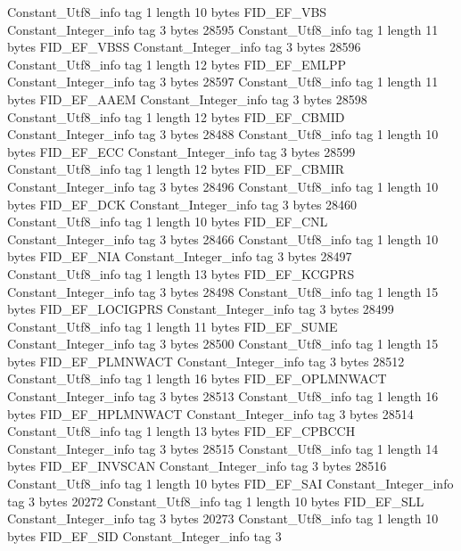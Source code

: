 {{		Constant_Utf8_info {
			tag	1
			length	10
			bytes	FID_EF_VBS
		}
		Constant_Integer_info {
			tag	3
			bytes	28595
		}
		Constant_Utf8_info {
			tag	1
			length	11
			bytes	FID_EF_VBSS
		}
		Constant_Integer_info {
			tag	3
			bytes	28596
		}
		Constant_Utf8_info {
			tag	1
			length	12
			bytes	FID_EF_EMLPP
		}
		Constant_Integer_info {
			tag	3
			bytes	28597
		}
		Constant_Utf8_info {
			tag	1
			length	11
			bytes	FID_EF_AAEM
		}
		Constant_Integer_info {
			tag	3
			bytes	28598
		}
		Constant_Utf8_info {
			tag	1
			length	12
			bytes	FID_EF_CBMID
		}
		Constant_Integer_info {
			tag	3
			bytes	28488
		}
		Constant_Utf8_info {
			tag	1
			length	10
			bytes	FID_EF_ECC
		}
		Constant_Integer_info {
			tag	3
			bytes	28599
		}
		Constant_Utf8_info {
			tag	1
			length	12
			bytes	FID_EF_CBMIR
		}
		Constant_Integer_info {
			tag	3
			bytes	28496
		}
		Constant_Utf8_info {
			tag	1
			length	10
			bytes	FID_EF_DCK
		}
		Constant_Integer_info {
			tag	3
			bytes	28460
		}
		Constant_Utf8_info {
			tag	1
			length	10
			bytes	FID_EF_CNL
		}
		Constant_Integer_info {
			tag	3
			bytes	28466
		}
		Constant_Utf8_info {
			tag	1
			length	10
			bytes	FID_EF_NIA
		}
		Constant_Integer_info {
			tag	3
			bytes	28497
		}
		Constant_Utf8_info {
			tag	1
			length	13
			bytes	FID_EF_KCGPRS
		}
		Constant_Integer_info {
			tag	3
			bytes	28498
		}
		Constant_Utf8_info {
			tag	1
			length	15
			bytes	FID_EF_LOCIGPRS
		}
		Constant_Integer_info {
			tag	3
			bytes	28499
		}
		Constant_Utf8_info {
			tag	1
			length	11
			bytes	FID_EF_SUME
		}
		Constant_Integer_info {
			tag	3
			bytes	28500
		}
		Constant_Utf8_info {
			tag	1
			length	15
			bytes	FID_EF_PLMNWACT
		}
		Constant_Integer_info {
			tag	3
			bytes	28512
		}
		Constant_Utf8_info {
			tag	1
			length	16
			bytes	FID_EF_OPLMNWACT
		}
		Constant_Integer_info {
			tag	3
			bytes	28513
		}
		Constant_Utf8_info {
			tag	1
			length	16
			bytes	FID_EF_HPLMNWACT
		}
		Constant_Integer_info {
			tag	3
			bytes	28514
		}
		Constant_Utf8_info {
			tag	1
			length	13
			bytes	FID_EF_CPBCCH
		}
		Constant_Integer_info {
			tag	3
			bytes	28515
		}
		Constant_Utf8_info {
			tag	1
			length	14
			bytes	FID_EF_INVSCAN
		}
		Constant_Integer_info {
			tag	3
			bytes	28516
		}
		Constant_Utf8_info {
			tag	1
			length	10
			bytes	FID_EF_SAI
		}
		Constant_Integer_info {
			tag	3
			bytes	20272
		}
		Constant_Utf8_info {
			tag	1
			length	10
			bytes	FID_EF_SLL
		}
		Constant_Integer_info {
			tag	3
			bytes	20273
		}
		Constant_Utf8_info {
			tag	1
			length	10
			bytes	FID_EF_SID
		}
		Constant_Integer_info {
			tag	3
}}}
